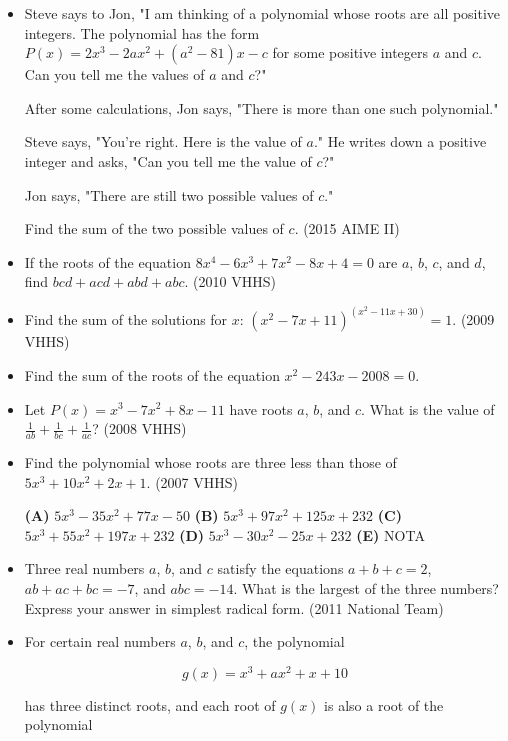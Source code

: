 \documentclass{article}
\begin{document}
\begin{itemize}

\item Steve says to Jon, "I am thinking of a polynomial whose roots are all positive integers. The polynomial has the form $P(x) = 2x^3-2ax^2+(a^2-81)x-c$ for some positive integers $a$ and $c$. Can you tell me the values of $a$ and $c$?"

After some calculations, Jon says, "There is more than one such polynomial."

Steve says, "You're right.  Here is the value of $a$." He writes down a positive integer and asks, "Can you tell me the value of $c$?"

Jon says, "There are still two possible values of $c$."

Find the sum of the two possible values of $c$. (2015 AIME II)

\item If the roots of the equation $8x^4-6x^3+7x^2-8x+4=0$ are $a$, $b$, $c$, and $d$, find $bcd+acd+abd+abc$. (2010 VHHS)

\item Find the sum of the solutions for $x$: $(x^2-7x+11)^(x^2-11x+30)=1$. (2009 VHHS)

\item Find the sum of the roots of the equation $x^2-243x-2008=0$. 

\item Let $P(x)=x^3-7x^2+8x-11$ have roots $a$, $b$, and $c$. What is the value of $\frac{1}{ab}+\frac{1}{bc}+\frac{1}{ac}$? (2008 VHHS)

\item Find the polynomial whose roots are three less than those of $5x^3+10x^2+2x+1$. (2007 VHHS)

\textbf{(A)} $5x^3-35x^2+77x-50$
\textbf{(B)} $5x^3+97x^2+125x+232$
\textbf{(C)} $5x^3+55x^2+197x+232$
\textbf{(D)} $5x^3-30x^2-25x+232$
\textbf{(E)} NOTA

\item Three real numbers $a$, $b$, and $c$ satisfy the equations $a+b+c=2$, $ab+ac+bc=-7$, and $abc=-14$. What is the largest of the three numbers? Express your answer in simplest radical form. (2011 National Team) 

\item For certain real numbers $a$, $b$, and $c$, the polynomial 

$$g(x) = x^3 + ax^2 + x + 10$$

has three distinct roots, and each root of $g(x)$ is also a root of the polynomial 


\end{itemize}
\end{document}
